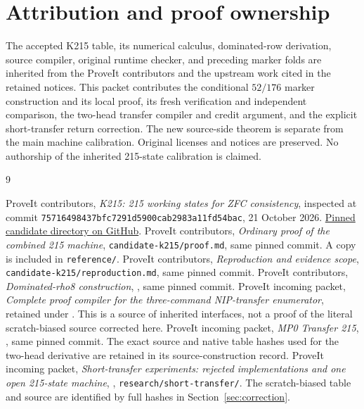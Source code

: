 \documentclass[11pt]{article}
\theoremstyle{definition}\newtheorem{definition}[theorem]{Definition}
\theoremstyle{remark}\newtheorem{remark}[theorem]{Remark}
\begin{document}
\section*{Attribution and proof ownership}

The accepted K215 table, its numerical calculus, dominated-row derivation,
source compiler, original runtime checker, and preceding marker folds
are inherited from the ProveIt contributors and the upstream work cited
in the retained notices. This packet contributes the conditional
$52/176$ marker construction and its local proof, its fresh verification
and independent comparison, the two-head transfer compiler and credit
argument, and the explicit short-transfer return correction. The new
source-side theorem is separate from the main machine calibration.
Original licenses and notices are preserved. No authorship of the
inherited 215-state calibration is claimed.

\begin{thebibliography}{9}
\raggedright
{} ProveIt contributors, \emph{K215: 215 working states for ZFC
consistency}, inspected at commit
\texttt{75716498437bfc7291d5900cab2983a11fd54bac}, 21 October 2026.
\href{https://github.com/VladimirReshetnikov/ProveIt/tree/75716498437bfc7291d5900cab2983a11fd54bac/Computability/BusyBeaver/Research/ZFC/candidate-k215}{Pinned candidate directory on GitHub}.
 ProveIt contributors, \emph{Ordinary proof of the combined
215 machine}, \texttt{candidate-k215/proof.md}, same pinned commit.
A copy is included in \texttt{reference/}.
 ProveIt contributors, \emph{Reproduction and
evidence scope}, \texttt{candidate-k215/reproduction.md}, same pinned commit.
 ProveIt contributors, \emph{Dominated-rho8 construction},
, same pinned commit.
 ProveIt incoming packet, \emph{Complete proof compiler for
the three-command NIP-transfer enumerator}, retained under
.
This is a source of inherited interfaces, not a proof of the literal
scratch-biased source corrected here.
 ProveIt incoming packet, \emph{MP0 Transfer 215},
, same pinned commit.
The exact source and native table hashes used for the two-head derivative
are retained in its source-construction record.
 ProveIt incoming packet, \emph{Short-transfer experiments:
rejected implementations and one open 215-state machine},
,
\texttt{research/short-transfer/}. The scratch-biased table and source
are identified by full hashes in Section~\ref{sec:correction}.
\end{thebibliography}
\end{document}
